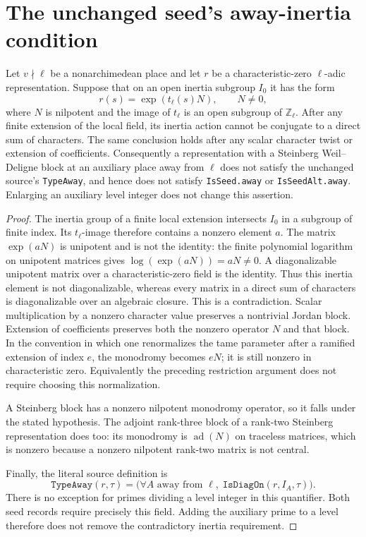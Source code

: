 \section{The unchanged seed's away-inertia condition}

\begin{lemma}
\label{AC-G60-seed-scope}
Let \(v\nmid\ell\) be a nonarchimedean place and let
\(r\) be a characteristic-zero \(\ell\)-adic representation.
Suppose that on an open inertia subgroup \(I_0\) it has the form
\[
 r(s)=\exp(t_\ell(s)N),\qquad N\ne0,
 \tag{G60-scope.1}
\]
where \(N\) is nilpotent and the image of \(t_\ell\) is an open
subgroup of \(\mathbb Z_\ell\).
After any finite extension of the local field, its inertia action
cannot be conjugate to a direct sum of characters.  The same conclusion
holds after any scalar character twist or extension of coefficients.
Consequently a representation with a Steinberg Weil--Deligne block
at an auxiliary place away from \(\ell\) does not satisfy the
unchanged source's \texttt{TypeAway}, and hence does not satisfy
\texttt{IsSeed.away} or \texttt{IsSeedAlt.away}.
Enlarging an auxiliary level integer does not change this assertion.
\end{lemma}
\begin{proof}
The inertia group of a finite local extension intersects \(I_0\)
in a subgroup of finite index.  Its \(t_\ell\)-image therefore
contains a nonzero element \(a\).  The matrix \(\exp(aN)\)
is unipotent and is not the identity: the finite polynomial logarithm
on unipotent matrices gives
\(\log(\exp(aN))=aN\ne0\).
A diagonalizable unipotent matrix over a characteristic-zero field
is the identity.  Thus this inertia element is not diagonalizable,
whereas every matrix in a direct sum of characters is diagonalizable
over an algebraic closure.  This is a contradiction.
Scalar multiplication by a nonzero character value preserves a
nontrivial Jordan block.  Extension of coefficients preserves both
the nonzero operator \(N\) and that block.  In the convention in which
one renormalizes the tame parameter after a ramified extension of
index \(e\), the monodromy becomes \(eN\); it is still nonzero in
characteristic zero.  Equivalently the preceding restriction argument
does not require choosing this normalization.

A Steinberg block has a nonzero nilpotent monodromy operator, so it
falls under the stated hypothesis.  The adjoint rank-three block of
a rank-two Steinberg representation does too: its monodromy is
\(\operatorname{ad}(N)\) on traceless matrices, which is nonzero
because a nonzero nilpotent rank-two matrix is not central.

Finally, the literal source definition is
\[
 \texttt{TypeAway}(r,\tau)
  =\bigl(\forall A\text{ away from }\ell,\;
          \texttt{IsDiagOn}(r,I_A,\tau)\bigr).
 \tag{G60-scope.2}
\]
There is no exception for primes dividing a level integer in this
quantifier.  Both seed records require precisely this field.
Adding the auxiliary prime to a level therefore does not remove
the contradictory inertia requirement.
\end{proof}

